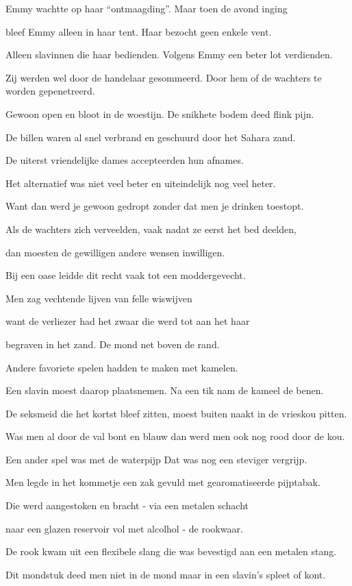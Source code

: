 Emmy wachtte op haar “ontmaagding”.
Maar toen de avond inging

bleef Emmy alleen in haar tent.
Haar bezocht geen enkele vent.

Alleen slavinnen die haar bedienden.
Volgens Emmy een beter lot verdienden.

Zij werden wel door de handelaar gesommeerd.
Door hem of de wachters te worden gepenetreerd.

Gewoon open en bloot in de woestijn.
De snikhete bodem deed flink pijn.

De billen waren al snel verbrand
en geschuurd door het Sahara zand.

De uiterst vriendelijke dames
accepteerden hun afnames.

Het alternatief was niet veel beter
en uiteindelijk nog veel heter.

Want dan werd je gewoon gedropt
zonder dat men je drinken toestopt.

Als de wachters zich verveelden,
vaak nadat ze eerst het bed deelden,

dan moesten de gewilligen
andere wensen inwilligen.

Bij een oase leidde dit recht
vaak tot een moddergevecht.

Men zag vechtende lijven
van felle wiswijven

want de verliezer had het zwaar
die werd tot aan het haar

begraven in het zand.
De mond net boven de rand.

Andere favoriete spelen
hadden te maken met kamelen.

Een slavin moest daarop plaatsnemen.
Na een tik nam de kameel de benen.

De seksmeid die het kortst bleef zitten,
moest buiten naakt in de vrieskou pitten.

Was men al door de val bont en blauw
dan werd men ook nog rood door de kou.

Een ander spel was met de waterpijp
Dat was nog een steviger vergrijp.

Men legde in het kommetje een zak
gevuld met gearomatiseerde pijptabak.

Die werd aangestoken en bracht -
via een metalen schacht

naar een glazen reservoir
vol met alcolhol - de rookwaar.

De rook kwam uit een flexibele slang
die was bevestigd aan een metalen stang.

Dit mondstuk deed men niet in de mond
maar in een slavin’s spleet of kont.

